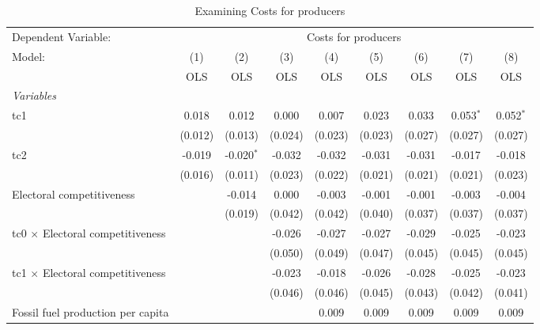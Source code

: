 
\begin{table}[htbp]
   \caption{Examining Costs for producers}
   \centering
   \begin{tabular}{lcccccccc}
      \toprule
      Dependent Variable: & \multicolumn{8}{c}{Costs for producers}\\
      Model:                                  & (1)     & (2)          & (3)     & (4)     & (5)     & (6)         & (7)         & (8)\\  
                                              &  OLS    & OLS          & OLS     & OLS     & OLS     & OLS         & OLS         & OLS\\  
      \midrule
      \emph{Variables}\\
      tc1                                     & 0.018   & 0.012        & 0.000   & 0.007   & 0.023   & 0.033       & 0.053$^{*}$ & 0.052$^{*}$\\   
                                              & (0.012) & (0.013)      & (0.024) & (0.023) & (0.023) & (0.027)     & (0.027)     & (0.027)\\   
      tc2                                     & -0.019  & -0.020$^{*}$ & -0.032  & -0.032  & -0.031  & -0.031      & -0.017      & -0.018\\   
                                              & (0.016) & (0.011)      & (0.023) & (0.022) & (0.021) & (0.021)     & (0.021)     & (0.023)\\   
      Electoral competitiveness               &         & -0.014       & 0.000   & -0.003  & -0.001  & -0.001      & -0.003      & -0.004\\   
                                              &         & (0.019)      & (0.042) & (0.042) & (0.040) & (0.037)     & (0.037)     & (0.037)\\   
      tc0 $\times$ Electoral competitiveness  &         &              & -0.026  & -0.027  & -0.027  & -0.029      & -0.025      & -0.023\\   
                                              &         &              & (0.050) & (0.049) & (0.047) & (0.045)     & (0.045)     & (0.045)\\   
      tc1 $\times$ Electoral competitiveness  &         &              & -0.023  & -0.018  & -0.026  & -0.028      & -0.025      & -0.023\\   
                                              &         &              & (0.046) & (0.046) & (0.045) & (0.043)     & (0.042)     & (0.041)\\   
      Fossil fuel production per capita       &         &              &         & 0.009   & 0.009   & 0.009       & 0.009       & 0.009\\   

\end{tabular}
\end{table}

